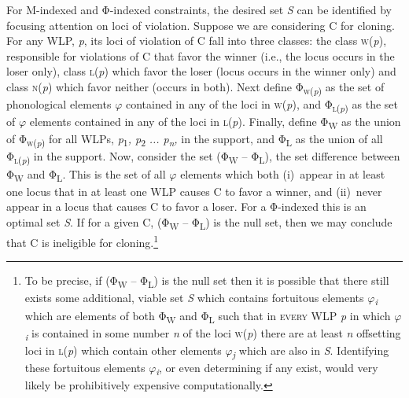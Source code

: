 \documentclass[output=paper,
modfonts
]{LSP/langsci}
\begin{document}
For M-indexed and Φ{}-indexed constraints, the desired set \textit{S} can be identified by focusing attention on loci of violation. Suppose we are considering  C for cloning. For any WLP, \textit{p}, its loci of violation of  C fall into three classes: the class \textsc{w}(\textit{p}), responsible for violations of C that favor the winner (i.e., the locus occurs in the loser only), class \textsc{l}(\textit{p}) which favor the loser (locus occurs in the winner only) and class \textsc{n}(\textit{p}) which favor neither (occurs in both). Next define Φ\textsc{\textsubscript{w}}\textsubscript{(}\textit{\textsubscript{p}}\textsubscript{)} as the set of phonological elements $\varphi $ contained in any of the loci in \textsc{w}(\textit{p}), and Φ\textsc{\textsubscript{l}}\textsubscript{(}\textit{\textsubscript{p}}\textsubscript{)} as the set of $\varphi $ elements contained in any of the loci in \textsc{l}(\textit{p}). Finally, define Φ\textsubscript{W} as the union of Φ\textsc{\textsubscript{w}}\textsubscript{(}\textit{\textsubscript{p}}\textsubscript{)} for all WLPs, \textit{p}\textsubscript{1}\textit{, p}\textsubscript{2}\textit{ ... p}\textit{\textsubscript{n}}\textit{,} in the support, and Φ\textsubscript{L} as the union of all Φ\textsc{\textsubscript{l}}\textsubscript{(}\textit{\textsubscript{p}}\textsubscript{)} in the support. Now, consider the set (Φ\textsubscript{W} -- Φ\textsubscript{L}), the set difference between Φ\textsubscript{W} and Φ\textsubscript{L}. This is the set of all $\varphi $ elements which both (i)~appear in at least one locus that in at least one WLP causes C to favor a winner, and (ii)~never appear in a locus that causes C to favor a loser. For a Φ-indexed  this is an optimal set \textit{S}. If for a given  C, (Φ\textsubscript{W} -- Φ\textsubscript{L}) is the null set, then we may conclude that C is ineligible for cloning.\footnote{To be precise, if (Φ\textsubscript{W} -- Φ\textsubscript{L}) is the null set then it is possible that there still exists some additional, viable set \textit{S} which contains fortuitous elements $\varphi $\textit{\textsubscript{i}} which are elements of both Φ\textsubscript{W} and Φ\textsubscript{L} such that in \textsc{every} WLP \textit{p} in which $\varphi $\textit{\textsubscript{i}} is contained in some number \textit{n} of the loci \textsc{w}(\textit{p}) there are at least \textit{n} offsetting loci in \textsc{l}(\textit{p}) which contain other elements $\varphi $\textit{\textsubscript{j}} which are also in \textit{S}. Identifying these fortuitous elements $\varphi $\textit{\textsubscript{i}}, or even determining if any exist, would very likely be prohibitively expensive computationally.}  
\end{document}

